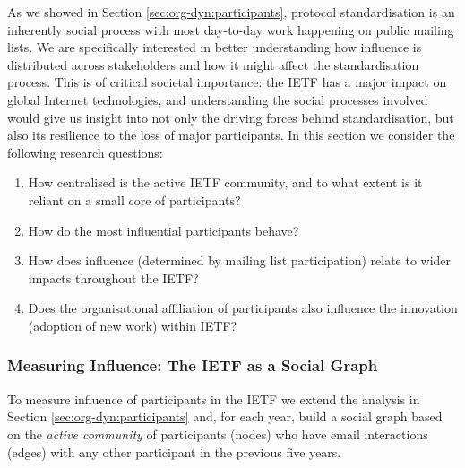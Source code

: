 \documentclass[twocolumn,10pt]{article}
\begin{document}


As we showed in Section \ref{sec:org-dyn:participants}, protocol
standardisation is an inherently social process with most day-to-day work
happening on public mailing lists.  We are specifically
interested in better understanding how influence is distributed across
stakeholders and how it might affect the standardisation process.  This is
of critical societal importance: the IETF has a major impact on global
Internet technologies, and understanding the social processes involved
would give us insight into not only the driving forces behind
standardisation, but also its resilience to the loss of major participants.
In this section we consider the following research questions: 
\begin{enumerate}
  \item How centralised is the active IETF community, and to what extent
    is it reliant on a small core of participants? 
  \item How do the most influential participants behave? 
  \item How does influence (determined by mailing list participation)
    relate to wider impacts throughout the IETF?
  \item Does the organisational affiliation of participants also
    influence the innovation (adoption of new work) within IETF?
\end{enumerate}

\subsubsection{Measuring Influence: The IETF as a Social Graph}
\label{subsec:measuring_influence}


To measure influence of participants in the IETF we extend the analysis in
Section \ref{sec:org-dyn:participants} and, for each year, build a social
graph based on the \emph{active community} of participants (nodes) who have
email interactions (edges) with any other participant in the previous five
years. 
\end{document}
